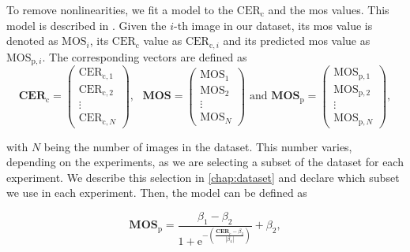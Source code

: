 To remove nonlinearities, we fit a model to the $\text{CER}_{\text{c}}$ and the \gls{mos} values.
This model is described in \cite{nonlin_fit_model_init_2000}\cite{nonlin_fit_appl_2017}.
Given the $i$-th image in our dataset, its \gls{mos} value is denoted as $\text{MOS}_{i}$, its $\text{CER}_{\text{c}}$ value as $\text{CER}_{\text{c},i}$ and its predicted \gls{mos} value as $\text{MOS}_{\text{p},i}$.
The corresponding vectors are defined as
\begin{equation}
    \mathbf{CER}_{\text{c}} =
    \begin{pmatrix}
        \text{CER}_{\text{c},1} \\
        \text{CER}_{\text{c},2} \\
        \vdots \\
        \text{CER}_{\text{c},N}
    \end{pmatrix},\text{ }
    \mathbf{MOS} =
    \begin{pmatrix}
        \text{MOS}_{1} \\
        \text{MOS}_{2} \\
        \vdots \\
        \text{MOS}_{N}
    \end{pmatrix} \text{ and }
    \mathbf{MOS}_{\text{p}} =
    \begin{pmatrix}
        \text{MOS}_{\text{p},1} \\
        \text{MOS}_{\text{p},2} \\
        \vdots \\
        \text{MOS}_{\text{p},N}
    \end{pmatrix},
\end{equation}

with $N$ being the number of images in the dataset.
This number varies, depending on the experiments, as we are selecting a subset of the dataset for each experiment.
We describe this selection in \autoref{chap:dataset} and declare which subset we use in each experiment.
Then, the model can be defined as

\begin{equation}
    \mathbf{MOS}_{\text{p}} = \frac{\beta_{1}-\beta_{2}}{1 + \text{e}^{-\left(\frac{\mathbf{CER}_{\text{c}}-\beta_{3}}{|\beta_{4}|}\right)}} + \beta_{2},
    \label{eq:nonlinear}
\end{equation}



